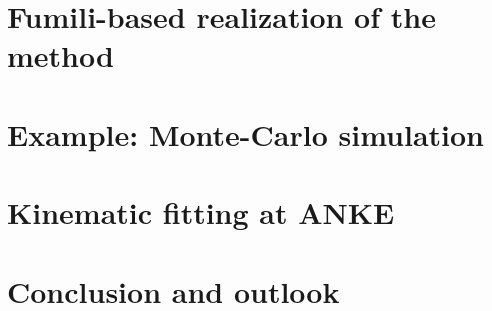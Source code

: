 \documentclass{webofc}
\begin{document}
\section{Fumili-based realization of the method}
% 

\section{Example: Monte-Carlo simulation}

\section{Kinematic fitting at ANKE}

\section{Conclusion and outlook}


% 
% 

\end{document}
